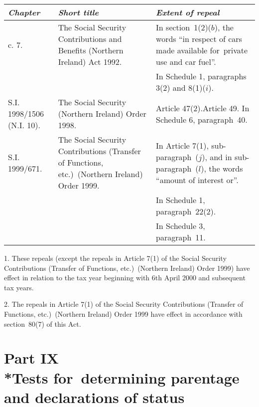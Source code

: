 \documentclass[12pt,a4paper]{article}
\begin{document}
{\footnotesize
\begin{longtable}{p{50pt}p{150.9199pt}p{153.07274pt}}
\hline
\itshape Chapter	&\itshape Short title	&\itshape Extent of repeal\\
\hline
\endhead
\hline
\endlastfoot
1992 c. 7. 	&The Social Security Contributions and Benefits (Northern Ireland) Act 1992. 	&In section~1(2)($b$), the words “in respect of cars made available for~private use and car fuel”.\\
&&		In Schedule 1, paragraphs 3(2)  and 8(1)($i$).\\
S.I. 1998/\hspace{0pt}1506 (N.I. 10).	&The Social Security (Northern Ireland) Order 1998. 	&Article 47(2).\newline Article 49. \newline In Schedule 6, paragraph~40. \\
S.I. 1999/\hspace{0pt}671. 	&The Social Security Contributions (Transfer of Functions, etc.)\ (Northern Ireland) Order 1999. 	&In Article 7(1), sub-paragraph~($j$), and in sub-paragraph~($l$), the words “amount of interest or”.\\
&&		In Schedule 1, paragraph~22(2).\\
&&		In Schedule 3, paragraph~11. \\
\end{longtable}

}

1. 
These repeals (except the repeals in Article 7(1)  of the Social Security Contributions (Transfer of Functions, etc.)\ (Northern Ireland) Order 1999) have effect in relation to the tax year beginning with 6th April 2000 and subsequent tax years.

2. 
The repeals in Article 7(1)  of the Social Security Contributions (Transfer of Functions, etc.)\ (Northern Ireland) Order 1999 have effect in accordance with section~80(7)  of this Act.

\section[Part IX --- Tests for~determining parentage and declarations of status]{Part IX\\*Tests for~determining parentage and declarations of status}
\end{document}
